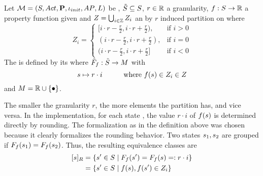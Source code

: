 \documentclass[preview]{standalone}
\begin{document}
\begin{definition}
	Let ${{{\mathcal{M}}}} = {{({S}, {Act}, {\textbf{P}}, {\iota_{init}}, {AP}, {L})}}$ be \achgphN, ${\tilde{{S}}} \subseteq {S}$, $r \in {\mathbb{R}}$ a granularity, ${f} : {S} \to {\mathbb{R}}$ a property function given and $Z =\bigcup_{i \in {\mathbb{Z}}}Z_i$ an by $r$ induced partition on \realnums where
	\[
		Z_i = 
		\begin{cases}
			[i \cdot r - \frac{r}{2}, i \cdot r + \frac{r}{2}), &\text{if } i > 0 \\
			(i \cdot r - \frac{r}{2}, i \cdot r + \frac{r}{2}), &\text{if } i = 0 \\
			(i \cdot r - \frac{r}{2}, i \cdot r + \frac{r}{2}]&\text{if } i < 0
		\end{cases}
	\]
	The \viewN \viewprop is defined by its \grpfctN \gfctprop where ${{\tilde{F}_{{f}}}} : {\tilde{{S}}} \to {\ensuremath{{M}}}$ with
	\[
	{s} \mapsto r \cdot i \quad\quad\quad \text{where } {f}({s}) \in Z_i \in Z
	\]
	and $\imggrp = \realnums \cup \remset$.
\end{definition}

The smaller the granularity $r$, the more elements the partition has, and vice versa. In the implementation, for each state \state, the value $r \cdot i$ of ${f}({s})$ is determined directly by rounding. The formalization as in the definition above was chosen because it clearly formalizes the rounding behavior. Two states ${s}_1, {s}_2$ are grouped if ${{F_{{f}}}}({s}_1) = {{F_{{f}}}}({s}_2)$. Thus, the resulting equivalence classes are
\begin{align*}
	{\ensuremath{{[{s}]_{{R}}}}} &= \{{s}' \in {S} \mid {\ensuremath{{F_{{f}}}}}({s}') = {{F_{{f}}}}({s}) =: r \cdot i\} \\
	&= \{{s}' \in {S} \mid {f}({s}), {f}({s}') \in Z_i\}
\end{align*}
\end{document}
